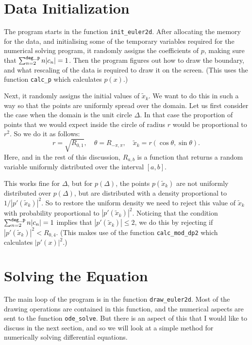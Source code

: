 \documentclass[12pt]{article}
\begin{document}
\section{Data Initialization}

The program starts in the function {\tt init\_euler2d}.  After allocating
the memory for the data, and initialising some of the temporary variables
required for the numerical solving program, it randomly assigns the
coefficients of $p$, making sure that $\sum_{n=2}^{\tt deg\_p} n |c_n| = 1$.
Then the program figures out how to draw the boundary, and what rescaling
of the data is required to draw it on the screen.  (This uses the
function {\tt calc\_p} which calculates $p(x)$.)

Next, it randomly assigns the initial values of $\tilde x_k$.  We want
to do this in such a way so that the points are uniformly spread over the
domain.  Let us first consider the case when the domain is the unit circle
$\Delta$.  In that case the proportion of points that we would expect
inside the circle of radius $r$ would be proportional to $r^2$.  So
we do it as follows:
\[ r = \sqrt{R_{0,1}},\quad \theta = R_{-\pi,\pi}, \quad
   \tilde x_k = r (\cos \theta, \sin \theta) .\]
Here, and in the rest of this discussion, $R_{a,b}$ is a function
that returns a random variable uniformly distributed over the interval
$[a,b]$.

This works fine for $\Delta$, but for $p(\Delta)$, the points 
$p(\tilde x_k)$ are not uniformly distributed over $p(\Delta)$,
but are distributed with a density proportional to
$1/|p'(\tilde x_k)|^2$.  So to restore the uniform density we need
to reject this value of $\tilde x_k$ with probability proportional
to $|p'(\tilde x_k)|^2$.  Noticing that the condition 
$\sum_{n=2}^{\tt deg\_p} n |c_n| = 1$ implies that 
$|p'(\tilde x_k)| \le 2$, we
do this by rejecting if $|p'(\tilde x_k)|^2 < R_{0,4}$.
(This makes use of the function {\tt calc\_mod\_dp2} which calculates
$|p'(x)|^2$.)

\section{Solving the Equation}

The main loop of the program is in the function {\tt draw\_euler2d}.
Most of the drawing operations are contained in this function, and
the numerical aspects are sent to the function {\tt ode\_solve}.
But there is an aspect of this that I would like
to discuss in the next section, and so we will look at a simple method for 
numerically solving differential equations.
\end{document}
